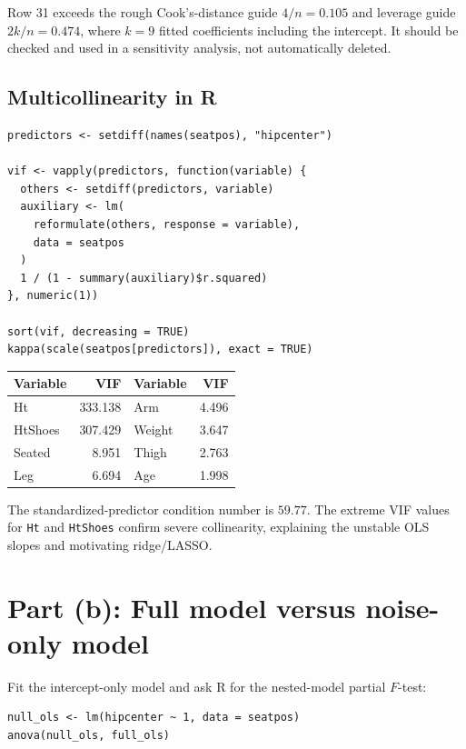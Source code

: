 ﻿\documentclass[11pt]{article}
\begin{document}
Row 31 exceeds the rough Cook's-distance guide $4/n=0.105$ and leverage guide
$2k/n=0.474$, where $k=9$ fitted coefficients including the intercept. It should
be checked and used in a sensitivity analysis, not automatically deleted.

\subsection{Multicollinearity in R}

\begin{lstlisting}
predictors <- setdiff(names(seatpos), "hipcenter")

vif <- vapply(predictors, function(variable) {
  others <- setdiff(predictors, variable)
  auxiliary <- lm(
    reformulate(others, response = variable),
    data = seatpos
  )
  1 / (1 - summary(auxiliary)$r.squared)
}, numeric(1))

sort(vif, decreasing = TRUE)
kappa(scale(seatpos[predictors]), exact = TRUE)
\end{lstlisting}

\begin{center}
\begin{tabular}{lr@{\qquad}lr}
\toprule
\rowcolor{navy!10}\textbf{Variable}&\textbf{VIF}&\textbf{Variable}&\textbf{VIF}\\
\midrule
Ht&333.138&Arm&4.496\\
HtShoes&307.429&Weight&3.647\\
Seated&8.951&Thigh&2.763\\
Leg&6.694&Age&1.998\\
\bottomrule
\end{tabular}
\end{center}

The standardized-predictor condition number is $59.77$. The extreme VIF values
for \texttt{Ht} and \texttt{HtShoes} confirm severe collinearity, explaining the
unstable OLS slopes and motivating ridge/LASSO.

\section{Part (b): Full model versus noise-only model}

Fit the intercept-only model and ask R for the nested-model partial $F$-test:

\begin{lstlisting}
null_ols <- lm(hipcenter ~ 1, data = seatpos)
anova(null_ols, full_ols)
\end{lstlisting}
\end{document}
